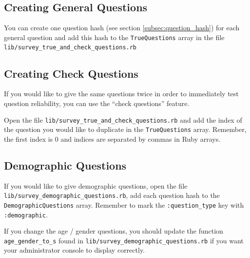 \documentclass[12pt]{article}
\begin{document}
%
%
%
%





\subsection{Creating General Questions}

You can create one question hash (see section \ref{subsec:question_hash}) for each general question and add this hash to the {\tt{TrueQuestions}} array in the file {\tt{lib/survey\_true\_and\_check\_questions.rb}}


\subsection{Creating Check Questions}\label{sec:check_questions}

If you would like to give the same questions twice in order to immediately test question reliability, you can use the ``check questions'' feature. 

Open the file {\tt{lib/survey\_true\_and\_check\_questions.rb}} and add the index of the question you would like to duplicate in the {\tt{TrueQuestions}} array. Remember, the first index is 0 and indices are separated by commas in Ruby arrays.

\subsection{Demographic Questions}

If you would like to give demographic questions, open the file {\tt{lib/survey\_demographic\_questions.rb}}, add each question hash to the {\tt{DemographicQuestions}} array. Remember to mark the {\tt{:question\_type}} key with {\tt{:demographic}}.

If you change the age / gender questions, you should update the function {\tt{age\_gender\_to\_s}} found in {\tt{lib/survey\_demographic\_questions.rb}} if you want your administrator console to display correctly.
\end{document}
